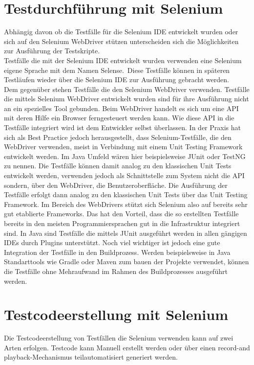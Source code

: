 \section{Testdurchführung mit Selenium}
\label{sec:testdurchführung_mit_selenium}
Abhängig davon ob die Testfälle für die Selenium IDE entwickelt wurden oder sich auf den Selenium WebDriver stützen unterscheiden sich die Möglichkeiten zur Ausführung der Testskripte.\\
Testfälle die mit der Selenium IDE entwickelt wurden verwenden eine Selenium eigene Sprache mit dem Namen \grq Selense\grq.\ Diese Testfälle können in späteren Testläufen wieder über die Selenium IDE zur Ausführung gebracht werden. \\
Dem gegenüber stehen Testfälle die den Selenium WebDriver verwenden.
Testfälle die mittels Selenium WebDriver entwickelt wurden sind für ihre Ausführung nicht an ein spezielles Tool gebunden. Beim WebDriver handelt es sich um eine API mit deren Hilfe ein Browser ferngesteuert werden kann. Wie diese API in die Testfälle integriert wird ist dem Entwickler selbst überlassen. In der Praxis hat sich als Best Practice jedoch herausgestellt, dass Selenium-Testfälle, die den WebDriver verwenden, meist in Verbindung mit einem Unit Testing Framework entwickelt werden.
Im Java Umfeld wären hier beispielsweise JUnit oder TestNG zu nennen.
Die Testfälle können damit analog zu den klassischen Unit Tests entwickelt werden, verwenden jedoch als Schnittstelle zum System nicht die API sondern, über den WebDriver, die Benutzeroberfläche. 
Die Ausführung der Testfälle erfolgt dann analog zu den klassischen Unit Tests über das Unit Testing Framework.
Im Bereich des WebDrivers stützt sich Selenium also auf bereits sehr gut etablierte Frameworks. Das hat den Vorteil, dass die so erstellten Testfälle bereits in den meisten Programmiersprachen gut in die Infrastruktur integriert sind. In Java sind Testfälle die mittels JUnit ausgeführt werden in allen gängigen IDEs durch Plugins unterstützt. Noch viel wichtiger ist jedoch eine gute Integration der Testfälle in den Buildprozess. Werden beispielsweise in Java Standarttools wie Gradle oder Maven zum bauen der Projekte verwendet, können die Testfälle ohne Mehraufwand im Rahmen des Buildprozesses ausgeführt werden.



\section{Testcodeerstellung mit Selenium}
\label{sec:Testdesign}
Die Testcodeerstellung von Testfällen die Selenium verwenden kann auf zwei Arten erfolgen.
Testcode kann Manuell erstellt werden oder über einen \grq record-and playback\grq -Mechanismus teilautomatisiert generiert werden.

